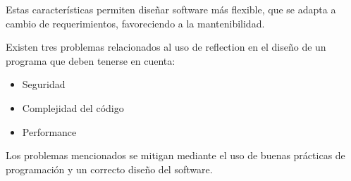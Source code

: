 Estas características permiten diseñar software más flexible, que se adapta a
cambio de requerimientos, favoreciendo a la mantenibilidad.

Existen tres problemas relacionados al uso de reflection en el diseño de un
programa que deben tenerse en cuenta:
\begin{itemize}
    \item Seguridad
    \item Complejidad del código
    \item Performance
\end{itemize}

Los problemas mencionados se mitigan mediante el uso de buenas prácticas de
programación y un correcto diseño del software.

